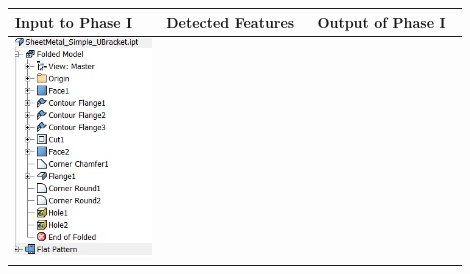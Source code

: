 \begin{minipage}[t]{\linewidth}
\begin{tabular}[!h]{@{} p{0.3\linewidth} | p{0.3\linewidth} | p{0.3\linewidth}@{}} \toprule

\textbf{Input to Phase I} & \textbf{Detected Features} & \textbf{Output of Phase I} \\ \midrule

\includegraphics[width=0.92\linewidth]{images/DefeatPhase_I_t1} &

\end{tabular}
\end{minipage}
